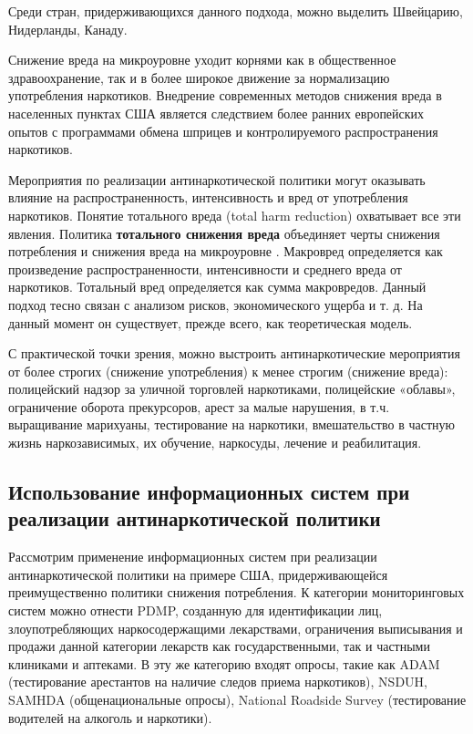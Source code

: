 Среди стран, придерживающихся данного подхода, можно выделить Швейцарию, 
Нидерланды, Канаду.
 
Снижение вреда на микроуровне уходит корнями как в общественное здравоохранение, 
так и в более широкое движение за нормализацию употребления наркотиков. 
Внедрение современных методов снижения вреда в населенных пунктах США является 
следствием более ранних европейских опытов с программами обмена шприцев и 
контролируемого распространения наркотиков. 

Мероприятия по реализации антинаркотической политики могут оказывать влияние на 
распространенность, интенсивность и вред от употребления наркотиков. Понятие 
тотального вреда (total harm reduction) охватывает все эти явления. Политика 
\textbf{тотального снижения вреда} объединяет черты снижения потребления и 
снижения вреда на микроуровне \cite{MacCoun2001}. Макровред определяется как 
произведение  распространенности, интенсивности и среднего вреда от наркотиков. 
Тотальный вред определяется как сумма макровредов. Данный подход тесно связан с 
анализом рисков, экономического ущерба и т. д. На данный момент он существует, 
прежде всего, как теоретическая модель. 

С практической точки зрения, можно выстроить антинаркотические мероприятия от 
более строгих (снижение употребления) к менее строгим (снижение вреда): 
полицейский надзор за уличной торговлей наркотиками, полицейские «облавы», 
ограничение оборота прекурсоров, арест за малые нарушения, в т.ч. выращивание 
марихуаны, тестирование на наркотики, вмешательство в частную жизнь 
наркозависимых, их обучение, наркосуды, лечение и реабилитация.

\subsection{Использование информационных систем при реализации антинаркотической 
    политики}

Рассмотрим применение информационных систем при реализации антинаркотической 
политики на примере США, придерживающейся преимущественно политики снижения 
потребления. К категории мониторинговых систем можно отнести PDMP, созданную для 
идентификации лиц, злоупотребляющих наркосодержащими лекарствами, ограничения 
выписывания и продажи данной категории лекарств как государственными, так и 
частными клиниками и аптеками. В эту же категорию входят опросы, такие как ADAM 
(тестирование арестантов на наличие следов приема наркотиков), NSDUH, SAMHDA 
(общенациональные опросы),  National Roadside Survey (тестирование водителей на 
алкоголь и наркотики). 

